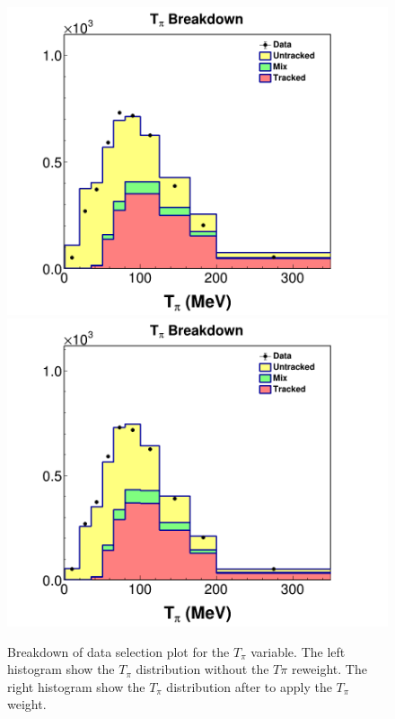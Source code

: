 \begin{figure}[!htb]
    \centering
    \includegraphics[scale=0.21]{Figures/Chapter4/DataSelection/Stacked_Tpi_mixed_notpiweight_data.png}
    \includegraphics[scale=0.21]{Figures/Chapter4/DataSelection/Stacked_Tpi_mixed_tpiweight_data.png}
    \caption{Breakdown of data selection plot for the $T_\pi$ variable. The left histogram show the $T_\pi$ distribution without the $T\pi$ reweight. The right histogram show the $T_\pi$ distribution after to apply the $T_\pi$ weight.}
    \label{fig:Analysis:Cuts:DataSelBreakdownTpireweight}
\end{figure}

